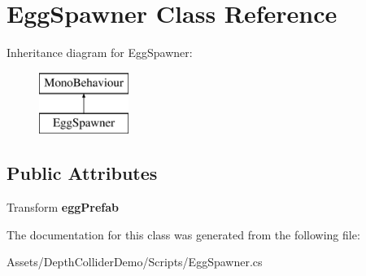 \hypertarget{class_egg_spawner}{}\section{Egg\+Spawner Class Reference}
\label{class_egg_spawner}
Inheritance diagram for Egg\+Spawner\+:\begin{figure}[H]
\begin{center}
\leavevmode
\includegraphics[height=2.000000cm]{class_egg_spawner}
\end{center}
\end{figure}
\subsection*{Public Attributes}
\begin{DoxyCompactItemize}
\item 
\mbox{\label{class_egg_spawner_a602ae008f92d10eff823fba342fee470}} 
Transform {\bfseries egg\+Prefab}
\end{DoxyCompactItemize}


The documentation for this class was generated from the following file\+:\begin{DoxyCompactItemize}
\item 
Assets/\+Depth\+Collider\+Demo/\+Scripts/Egg\+Spawner.\+cs\end{DoxyCompactItemize}

